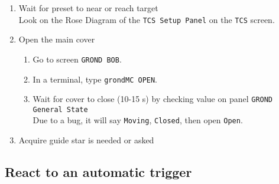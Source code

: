 \documentclass[11pt,fleqn]{book}
\begin{document}
\begin{enumerate}
\begin{enumerate}
    \item Wait for preset to near or reach target\\
          Look on the Rose Diagram of the \texttt{TCS Setup Panel} on the \texttt{TCS} screen.
    \item Open the main cover
    \begin{enumerate}
      \item Go to screen \texttt{GROND BOB}.
      \item In a terminal, type \texttt{grondMC OPEN}.
      \item Wait for cover to close (10-15 s) by checking value on panel \texttt{GROND General State}\\
            Due to a bug, it will say \texttt{Moving}, \texttt{Closed}, then open \texttt{Open}. 
    \end{enumerate}
    \item Acquire guide star is needed or asked
  \end{enumerate}
\end{enumerate}


\subsection{React to an automatic trigger}
\end{document}
